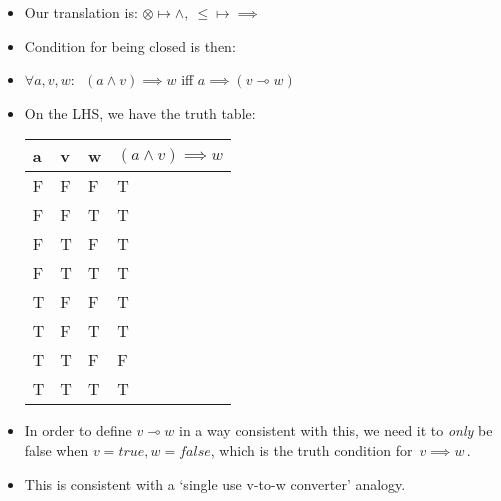 \begin{itemize}
    \item Our translation is: $\otimes \mapsto \land,\ \leq \mapsto \implies$
    \item Condition for being closed is then:
    \item $\forall a,v,w:$ \,$(a \land v) \implies w$ iff $a \implies (v \multimap w)$\,
    \item On the LHS, we have the truth table:
          \begin{minipage}{0.48\textwidth}
            \begin{tabular}{|l|l|l|l|}
              a & v & w & $(a \land v) \implies w$ \\ \hline
              F & F & F & T                        \\
              F & F & T & T                        \\
              F & T & F & T                        \\
              F & T & T & T                        \\
              T & F & F & T                        \\
              T & F & T & T                        \\
              T & T & F & F                        \\
              T & T & T & T
            \end{tabular}
          \end{minipage}

    \item In order to define $v \multimap w$ in a way consistent with this, we need it to \emph{only} be false when $v=true, w=false$, which is the truth condition for \,$v \implies w$\,.
    \item This is consistent with a `single use v-to-w converter' analogy.
  \end{itemize}
